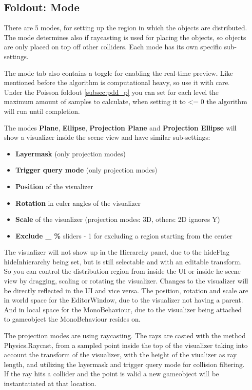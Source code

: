 \documentclass{paper}
\newcommand*\bracket[1]{\lbrack#1\rbrack} %
\begin{document}
\subsection{Foldout: Mode}\label{subsec:pdd_m}
There are 5 modes, for setting up the region in which the objects are distributed. The mode determines also if raycasting is used for placing the objects, so objects are only placed on top off other colliders. Each mode has its own specific sub-settings.
\par
The mode tab also contains a toggle for enabling the real-time preview. Like mentioned before the algorithm is computational heavy, so use it with care. Under the Poisson foldout \bracket{\ref{subsec:pdd_p}} you can set for each level the maximum amount of samples to calculate, when setting it to <= 0 the algorithm will run until completion.
\par
The modes {\large\textbf{Plane}}, {\large\textbf{Ellipse}}, {\large\textbf{Projection Plane}} and {\large\textbf{Projection Ellipse}} will show a visualizer inside the scene view and have similar sub-settings:
\begin{itemize}
\item \textbf{Layermask} (only projection modes)
\item \textbf{Trigger query mode} (only projection modes)
\item \textbf{Position} of the visualizer
\item \textbf{Rotation} in euler angles of the visualizer
\item \textbf{Scale} of the visualizer (projection modes: 3D, others: 2D ignores Y)
\item \textbf{Exclude \_ \%} sliders \bracket{0 - 1} for excluding a region starting from the center
\end{itemize}
The visualizer will not show up in the Hierarchy panel, due to the hideFlag hideInhierarchy being set, but is still selectable and with an editable transform. So you can control the distribution region from inside the UI or inside he scene view by dragging, scaling or rotating the visualizer. Changes to the visualizer will be directly reflected in the UI and vice versa.
The position, rotation and scale are in world space for the EditorWindow, due to the visualizer not having a parent. And in local space for the MonoBehaviour, due to the visualizer being attached to gameobject the MonoBehaviour resides on.
\par
The projection modes are using raycasting. The rays are casted with the method Physics.Raycast, from a sampled point inside the top of the visualizer taking into account the transform of the visualizer, with the height of the viualizer as ray length, and utilizing the layermask and trigger query mode for collision filtering. If the ray hits a collider and the point is valid a new gameobject will be instantatiated at that location.
\end{document}

